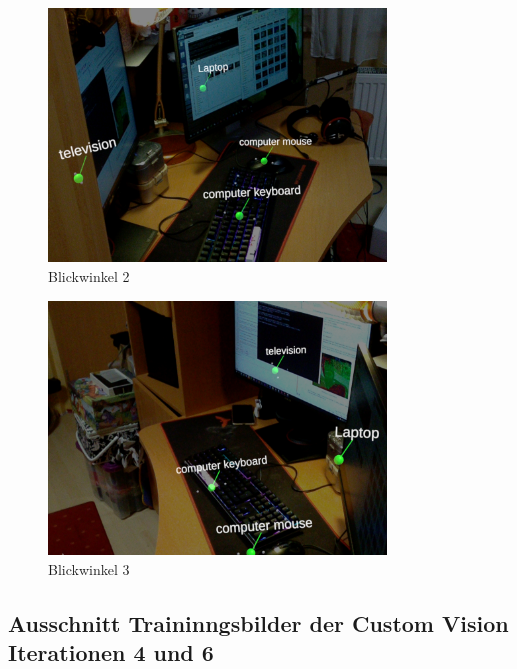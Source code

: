 \begin{figure}[H]
	\centering
	\includegraphics[width=0.8\textwidth]{images/ML_20201014_03.02.35.jpg}
	\caption[Objekte mit Label. Blickwinkel 2]{Blickwinkel 2}
	\label{img:m2}
\end{figure}
\begin{figure}[H]
	\centering
	\includegraphics[width=0.8\textwidth]{images/ML_20201014_03.02.44.jpg}
	\caption[Objekte mit Label. Blickwinkel 3]{Blickwinkel 3}
	\label{img:m3}
\end{figure}

\subsection{Ausschnitt Traininngsbilder der Custom Vision Iterationen 4 und 6}
\label{appendix:it4train}

